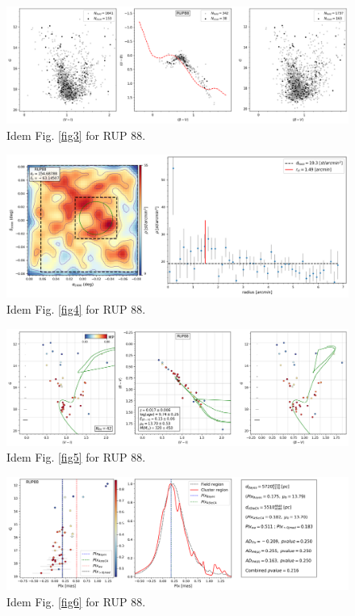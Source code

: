 \documentclass[draft]{aa}
\begin{document}
\begin{figure}[ht]
    \centering
    \includegraphics[width=\hsize]{../figs/obs_RUP88.png}
    \caption{Idem Fig. \ref{fig3} for RUP 88.}
    \label{fig31}
\end{figure}
\begin{figure}[ht]
    \centering
    \includegraphics[width=\hsize]{../figs/dmap_rup88.png}
    \caption{Idem Fig. \ref{fig4} for RUP 88.}
    \label{fig32}
\end{figure}
\begin{figure}[ht]
    \centering
    \includegraphics[width=\hsize]{../figs/cmds_rup88.png}
    \caption{Idem Fig. \ref{fig5} for RUP 88.}
    \label{fig33}
\end{figure}
\begin{figure}[ht]
    \centering
    \includegraphics[width=\hsize]{../figs/plx_RUP88.png}
    \caption{Idem Fig. \ref{fig6} for RUP 88.}
    \label{fig34}
\end{figure}
\end{document}
